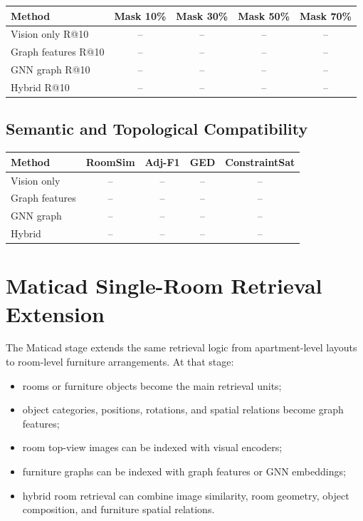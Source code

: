 \documentclass[11pt,a4paper]{article}
\begin{document}
\begin{center}
\begin{tabular}{lcccc}
\toprule
Method & Mask 10\% & Mask 30\% & Mask 50\% & Mask 70\% \\
\midrule
Vision only R@10 & -- & -- & -- & -- \\
Graph features R@10 & -- & -- & -- & -- \\
GNN graph R@10 & -- & -- & -- & -- \\
Hybrid R@10 & -- & -- & -- & -- \\
\bottomrule
\end{tabular}
\end{center}

\subsection{Semantic and Topological Compatibility}

\begin{center}
\begin{tabular}{lcccc}
\toprule
Method & RoomSim & Adj-F1 & GED & ConstraintSat \\
\midrule
Vision only & -- & -- & -- & -- \\
Graph features & -- & -- & -- & -- \\
GNN graph & -- & -- & -- & -- \\
Hybrid & -- & -- & -- & -- \\
\bottomrule
\end{tabular}
\end{center}

\section{Maticad Single-Room Retrieval Extension}

The Maticad stage extends the same retrieval logic from apartment-level layouts to room-level furniture arrangements. At that stage:

\begin{itemize}
    \item rooms or furniture objects become the main retrieval units;
    \item object categories, positions, rotations, and spatial relations become graph features;
    \item room top-view images can be indexed with visual encoders;
    \item furniture graphs can be indexed with graph features or GNN embeddings;
    \item hybrid room retrieval can combine image similarity, room geometry, object composition, and furniture spatial relations.
\end{itemize}
\end{document}

